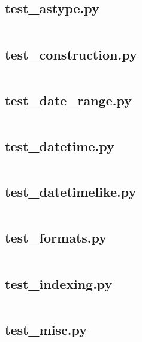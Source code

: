 \documentclass{article}
\begin{document}
\subsection{test\_astype.py}
\inputminted{python}{/home/dufferzafar/dev/@clones/pandas/pandas/tests/indexes/datetimes/test_astype.py}
\newpage

\subsection{test\_construction.py}
\inputminted{python}{/home/dufferzafar/dev/@clones/pandas/pandas/tests/indexes/datetimes/test_construction.py}
\newpage

\subsection{test\_date\_range.py}
\inputminted{python}{/home/dufferzafar/dev/@clones/pandas/pandas/tests/indexes/datetimes/test_date_range.py}
\newpage

\subsection{test\_datetime.py}
\inputminted{python}{/home/dufferzafar/dev/@clones/pandas/pandas/tests/indexes/datetimes/test_datetime.py}
\newpage

\subsection{test\_datetimelike.py}
\inputminted{python}{/home/dufferzafar/dev/@clones/pandas/pandas/tests/indexes/datetimes/test_datetimelike.py}
\newpage

\subsection{test\_formats.py}
\inputminted{python}{/home/dufferzafar/dev/@clones/pandas/pandas/tests/indexes/datetimes/test_formats.py}
\newpage

\subsection{test\_indexing.py}
\inputminted{python}{/home/dufferzafar/dev/@clones/pandas/pandas/tests/indexes/datetimes/test_indexing.py}
\newpage

\subsection{test\_misc.py}
\inputminted{python}{/home/dufferzafar/dev/@clones/pandas/pandas/tests/indexes/datetimes/test_misc.py}
\newpage
\end{document}
